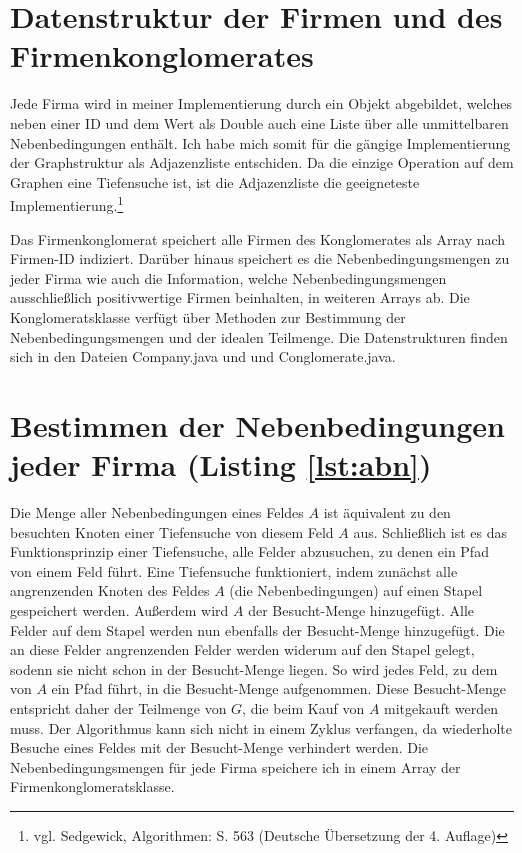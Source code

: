 \section{Datenstruktur der Firmen und des Firmenkonglomerates}
Jede Firma wird in meiner Implementierung durch ein Objekt abgebildet, welches neben einer ID und dem Wert als Double auch eine Liste über alle unmittelbaren Nebenbedingungen enthält. Ich habe mich somit für die gängige Implementierung der Graphstruktur als Adjazenzliste entschiden. Da die einzige Operation auf dem Graphen eine Tiefensuche ist, ist die Adjazenzliste die geeigneteste Implementierung.\footnote{vgl. Sedgewick, Algorithmen: S. 563 (Deutsche Übersetzung der 4. Auflage)}

Das Firmenkonglomerat speichert alle Firmen des Konglomerates als Array nach Firmen-ID indiziert. Darüber hinaus speichert es die Nebenbedingungsmengen zu jeder Firma wie auch die Information, welche Nebenbedingungsmengen ausschließlich positivwertige Firmen beinhalten, in weiteren Arrays ab. Die Konglomeratsklasse verfügt über Methoden zur Bestimmung der Nebenbedingungsmengen und der idealen Teilmenge. Die Datenstrukturen finden sich in den Dateien Company.java und und Conglomerate.java.

\section{Bestimmen der Nebenbedingungen jeder Firma (Listing \ref{lst:abn})}
Die Menge aller Nebenbedingungen eines Feldes \(A\) ist äquivalent zu den besuchten Knoten einer Tiefensuche von diesem Feld \(A\) aus. Schließlich ist es das Funktionsprinzip einer Tiefensuche, alle Felder abzusuchen, zu denen ein Pfad von einem Feld führt. Eine Tiefensuche funktioniert, indem zunächst alle angrenzenden Knoten des Feldes \(A\) (die Nebenbedingungen) auf einen Stapel gespeichert werden.
Außerdem wird \(A\) der Besucht-Menge hinzugefügt. Alle Felder auf dem Stapel werden nun ebenfalls der Besucht-Menge hinzugefügt. Die an diese Felder angrenzenden Felder werden widerum auf den Stapel gelegt, sodenn sie nicht schon in der Besucht-Menge liegen. So wird jedes Feld, zu dem von \(A\) ein Pfad führt, in die Besucht-Menge aufgenommen. Diese Besucht-Menge entspricht daher der Teilmenge von \(G\), die beim Kauf von \(A\) mitgekauft werden muss. Der Algorithmus kann sich nicht in einem Zyklus verfangen, da wiederholte Besuche eines Feldes mit der Besucht-Menge verhindert werden. Die Nebenbedingungsmengen für jede Firma speichere ich in einem Array der Firmenkonglomeratsklasse.

